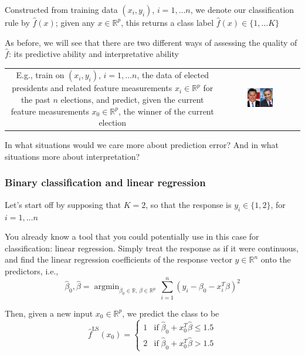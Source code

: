 \documentclass[mathserif]{beamer}
\newcommand{\argmin}{\mathop{\mathrm{argmin}}}
\def\R{\mathds{R}}
\def\hbeta{\hat{\beta}}
\def\red{\color[rgb]{0.8,0,0}}
\begin{document}
\begin{frame}
\frametitle{}
Constructed from training data $(x_i,y_i)$, $i=1,\ldots n$, we denote our 
classification rule by $\hat{f}(x)$; given any $x \in \R^p$, this returns a 
class label $\hat{f}(x) \in \{1,\ldots K\}$

\bigskip
As before, we will see that there are two different ways of assessing the quality 
of $\hat{f}$: its {\red predictive ability} and {\red interpretative ability}

\bigskip
\begin{tabular}{cc}
\parbox{0.5\textwidth}{
E.g., train on $(x_i,y_i)$, $i=1,\ldots n$, the data of elected presidents
and related feature measurements $x_i \in \R^p$ for the past $n$ elections,
and predict, given the current feature measurements $x_0 \in \R^p$, the winner 
of the current election}&
\hspace{3pt}
\parbox{0.35\textwidth}{
\includegraphics[width=0.35\textwidth]{candidates.jpg}
}
\end{tabular}

\bigskip
In what situations would we care more about prediction error? And in what 
situations more about interpretation?
\end{frame}

\begin{frame}
\frametitle{Binary classification and linear regression}
Let's start off by supposing that $K=2$, so that the response is 
$y_i \in \{1,2\}$, for $i=1,\ldots n$

\bigskip
You already know a tool that you could potentially use in this case for classification:
{\red linear regression}. Simply treat the response
as if it were continuous, and find the linear regression coefficients 
of the response vector $y \in \R^n$ onto the predictors, i.e., 
$$\hbeta_0, \hbeta = \argmin_{\beta_0\in\R, \,\beta \in \R^p} \, 
\sum_{i=1}^n (y_i - \beta_0 - x_i^T \beta)^2 $$

Then, given a new input $x_0 \in \R^p$, we predict the class to be
$$\hat{f}^\mathrm{LS}(x_0) = \begin{cases}
1 & \mathrm{if}\; \hbeta_0 + x_0^T \hbeta \leq 1.5 \\
2 & \mathrm{if}\; \hbeta_0 + x_0^T \hbeta  > 1.5
\end{cases}$$
\end{frame}
\end{document}
